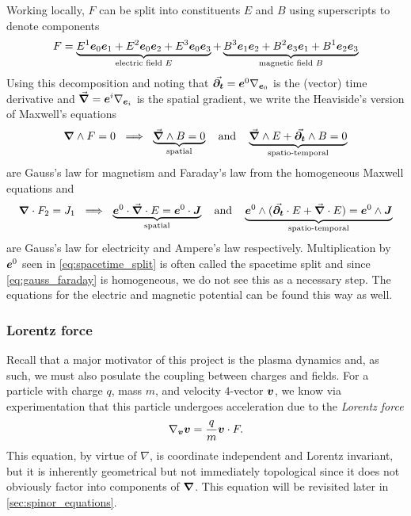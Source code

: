 \documentclass{article}
\begin{document}
Working locally, $F$ can be split into constituents $E$ and $B$ using superscripts to denote components
\begin{align}
	F = \underbrace{E^1 \boldsymbol{e}_0 \boldsymbol{e}_1 + E^2 \boldsymbol{e}_0 \boldsymbol{e}_2 + E^3 \boldsymbol{e}_0 \boldsymbol{e}_3}_{\textrm{electric field } E} + \underbrace{B^{3} \boldsymbol{e}_1 \boldsymbol{e}_2 + B^{2} \boldsymbol{e}_3 \boldsymbol{e}_1 + B^{1} \boldsymbol{e}_2 \boldsymbol{e}_3}_{\textrm{magnetic field } B}
\end{align}
Using this decomposition and noting that $\vec{\boldsymbol{\partial_t}}=\boldsymbol{e}^0 \nabla_{\boldsymbol{e}_0}$ is the (vector) time derivative and  $\vec{\boldsymbol{\nabla}} = \boldsymbol{e}^i \nabla_{\boldsymbol{e}_i}$ is the spatial gradient, we write the Heaviside's version of Maxwell's equations
\begin{align}
\label{eq:gauss_faraday}
	\boldsymbol{\nabla} \wedge F=0 ~\implies~ \underbrace{\vec{\boldsymbol{\nabla}} \wedge B = 0}_{\textrm{spatial}} ~~~\textrm{and}~~~ \underbrace{\vec{\boldsymbol{\nabla}} \wedge E + \vec{\boldsymbol{\partial_t}} \wedge B = 0}_{\textrm{spatio-temporal}}
\end{align}
are Gauss's law for magnetism and Faraday's law from the homogeneous Maxwell equations and
\begin{align}
\label{eq:spacetime_split}
	\boldsymbol{\nabla} \cdot F_2=J_1 ~\implies~ \underbrace{\boldsymbol{e}^0 \cdot \vec{\boldsymbol{\nabla}} \cdot E = \boldsymbol{e}^0 \cdot \boldsymbol{J}}_{\textrm{spatial}}~~~\textrm{and}~~~ \underbrace{\boldsymbol{e}^0 \wedge (\vec{\boldsymbol{\partial_t}} \cdot E + \vec{\boldsymbol{\nabla}} \cdot E) = \boldsymbol{e}^0 \wedge \boldsymbol{J}}_{\textrm{spatio-temporal}}
\end{align}
are Gauss's law for electricity and Ampere's law respectively. Multiplication by $\boldsymbol{e}^0$ seen in \cref{eq:spacetime_split} is often called the spacetime split and since \cref{eq:gauss_faraday} is homogeneous, we do not see this as a necessary step. The equations for the electric and magnetic potential can be found this way as well.

\subsubsection{Lorentz force}

Recall that a major motivator of this project is the plasma dynamics and, as such, we must also posulate the coupling between charges and fields. For a particle with charge $q$, mass $m$, and velocity $4$-vector $\boldsymbol{v}$, we know via experimentation that this particle undergoes acceleration due to the \emph{Lorentz force} 
\begin{equation}
    \label{eq:lorentz_force}
    \nabla_{\boldsymbol{v}}\boldsymbol{v} = \frac{q}{m} \boldsymbol{v} \cdot F.
\end{equation}
This equation, by virtue of $\nabla$, is coordinate independent and Lorentz invariant, but it is inherently geometrical but not immediately topological since it does not obviously factor into components of $\boldsymbol{\nabla}$. This equation will be revisited later in \cref{sec:spinor_equations}.
\end{document}
